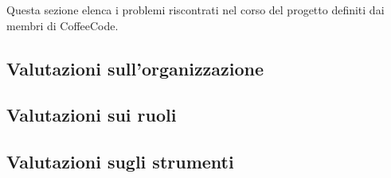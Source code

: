 \documentclass[../piano-di-qualifica.tex]{subfiles}
\begin{document}
Questa sezione elenca i problemi riscontrati nel corso del progetto definiti dai membri di CoffeeCode.

\subsection{Valutazioni sull’organizzazione}
\label{sub:valutazioni_organizzazione}

\subsection{Valutazioni sui ruoli}
\label{sub:valutazioni_ruoli}

\subsection{Valutazioni sugli strumenti}
\label{sub:valutazioni_strumenti}
\end{document}
